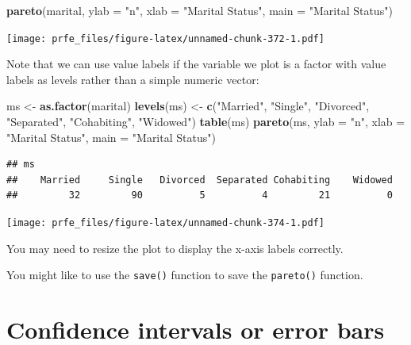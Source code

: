 \documentclass[12pt,]{book}
\newenvironment{Shaded}{\begin{snugshade}}{\end{snugshade}}
\newcommand{\KeywordTok}[1]{\textcolor[rgb]{0.13,0.29,0.53}{\textbf{#1}}}
\newcommand{\DataTypeTok}[1]{\textcolor[rgb]{0.13,0.29,0.53}{#1}}
\newcommand{\StringTok}[1]{\textcolor[rgb]{0.31,0.60,0.02}{#1}}
\newcommand{\NormalTok}[1]{#1}
\theoremstyle{definition}
\theoremstyle{definition}
\theoremstyle{definition}
\theoremstyle{remark}
\begin{document}
\begin{Shaded}
\begin{Highlighting}[]
\KeywordTok{pareto}\NormalTok{(marital, }\DataTypeTok{ylab =} \StringTok{"n"}\NormalTok{, }\DataTypeTok{xlab =} \StringTok{"Marital Status"}\NormalTok{,}
       \DataTypeTok{main =} \StringTok{"Marital Status"}\NormalTok{)}
\end{Highlighting}
\end{Shaded}

\texttt{[image: prfe\_files/figure-latex/unnamed-chunk-372-1.pdf]}

Note that we can use value labels if the variable we plot is a factor
with value labels as levels rather than a simple numeric vector:

\begin{Shaded}
\begin{Highlighting}[]
\NormalTok{ms <-}\StringTok{ }\KeywordTok{as.factor}\NormalTok{(marital)}
\KeywordTok{levels}\NormalTok{(ms) <-}\StringTok{ }\KeywordTok{c}\NormalTok{(}\StringTok{"Married"}\NormalTok{, }\StringTok{"Single"}\NormalTok{, }\StringTok{"Divorced"}\NormalTok{, }\StringTok{"Separated"}\NormalTok{,}
                \StringTok{"Cohabiting"}\NormalTok{, }\StringTok{"Widowed"}\NormalTok{)}
\KeywordTok{table}\NormalTok{(ms)}
\KeywordTok{pareto}\NormalTok{(ms, }\DataTypeTok{ylab =} \StringTok{"n"}\NormalTok{, }\DataTypeTok{xlab =} \StringTok{"Marital Status"}\NormalTok{,}
       \DataTypeTok{main =} \StringTok{"Marital Status"}\NormalTok{)}
\end{Highlighting}
\end{Shaded}

\begin{verbatim}
## ms
##    Married     Single   Divorced  Separated Cohabiting    Widowed 
##         32         90          5          4         21          0
\end{verbatim}

\texttt{[image: prfe\_files/figure-latex/unnamed-chunk-374-1.pdf]}

You may need to resize the plot to display the x-axis labels correctly.

You might like to use the \texttt{save()} function to save the
\texttt{pareto()} function.

\hypertarget{confidence-intervals-or-error-bars}{%
\section{Confidence intervals or error
bars}\label{confidence-intervals-or-error-bars}}
\end{document}
